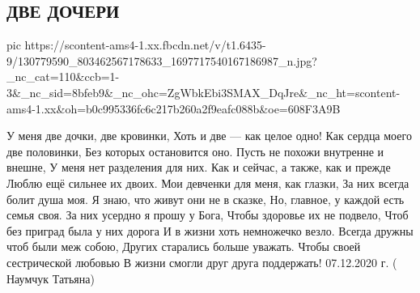  
 
 
 
 

\subsection{ДВЕ ДОЧЕРИ}

\ifcmt
  pic https://scontent-ams4-1.xx.fbcdn.net/v/t1.6435-9/130779590_803462567178633_1697717540167186987_n.jpg?_nc_cat=110&ccb=1-3&_nc_sid=8bfeb9&_nc_ohc=ZgWbkEbi3SMAX_DqJre&_nc_ht=scontent-ams4-1.xx&oh=b0c995336fc6c217b260a2f9eafc088b&oe=608F3A9B
\fi

У меня две дочки, две кровинки,
Хоть и две --- как целое одно!
Как сердца моего две половинки,
Без которых остановится оно.
Пусть не похожи внутренне и внешне,
У меня нет разделения для них.
Как и сейчас, а также, как и прежде
Люблю ещё сильнее их двоих.
Мои девченки для меня, как глазки,
За них всегда болит душа моя.
Я знаю, что живут они не в сказке,
Но, главное, у каждой есть семья своя.
За них усердно я прошу у Бога,
Чтобы здоровье их не подвело,
Чтоб без приград была у них дорога
И в жизни хоть немножечко везло.
Всегда дружны чтоб были меж собою,
Других старались больше уважать.
Чтобы своей сестрической любовью
В жизни смогли друг друга поддержать!
     07.12.2020 г. ( Наумчук Татьяна)
